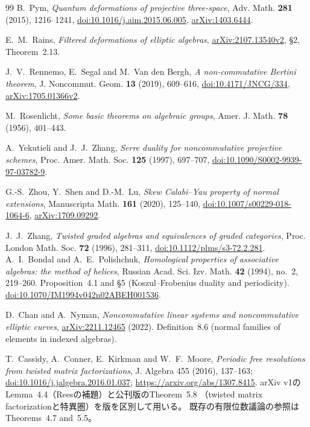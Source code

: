 \documentclass[11pt,a4paper]{ltjsarticle}
\numberwithin{equation}{section}
\begin{document}
\begin{thebibliography}{99}
B.~Pym,
\textit{Quantum deformations of projective three-space},
Adv. Math. \textbf{281} (2015), 1216--1241,
\href{https://doi.org/10.1016/j.aim.2015.06.005}{doi:10.1016/j.aim.2015.06.005},
\href{https://arxiv.org/abs/1403.6444}{arXiv:1403.6444}.

E.~M.~Rains,
\textit{Filtered deformations of elliptic algebras},
\href{https://arxiv.org/abs/2107.13540}{arXiv:2107.13540v2},
\S2, Theorem~2.13.

J.~V.~Rennemo, E.~Segal and M.~Van den Bergh,
\textit{A non-commutative Bertini theorem},
J. Noncommut. Geom. \textbf{13} (2019), 609--616,
\href{https://doi.org/10.4171/JNCG/334}{doi:10.4171/JNCG/334},
\href{https://arxiv.org/abs/1705.01366}{arXiv:1705.01366v2}.

M.~Rosenlicht,
\textit{Some basic theorems on algebraic groups},
Amer. J. Math. \textbf{78} (1956), 401--443.

A.~Yekutieli and J.~J.~Zhang,
\textit{Serre duality for noncommutative projective schemes},
Proc. Amer. Math. Soc. \textbf{125} (1997), 697--707,
\href{https://doi.org/10.1090/S0002-9939-97-03782-9}{doi:10.1090/S0002-9939-97-03782-9}.

G.-S.~Zhou, Y.~Shen and D.-M.~Lu,
\textit{Skew Calabi--Yau property of normal extensions},
Manuscripta Math. \textbf{161} (2020), 125--140,
\href{https://doi.org/10.1007/s00229-018-1064-6}{doi:10.1007/s00229-018-1064-6},
\href{https://arxiv.org/abs/1709.09292}{arXiv:1709.09292}.

J.~J.~Zhang,
\textit{Twisted graded algebras and equivalences of graded categories},
Proc. London Math. Soc. \textbf{72} (1996), 281--311,
\href{https://doi.org/10.1112/plms/s3-72.2.281}{doi:10.1112/plms/s3-72.2.281}.
A.~I.~Bondal and A.~E.~Polishchuk,
\emph{Homological properties of associative algebras: the method of helices},
Russian Acad. Sci. Izv. Math. \textbf{42} (1994), no.~2, 219--260.
Proposition~4.1 and \S5 (Koszul--Frobenius duality and periodicity).
\href{https://doi.org/10.1070/IM1994v042n02ABEH001536}
{doi:10.1070/IM1994v042n02ABEH001536}.

D.~Chan and A.~Nyman,
\emph{Noncommutative linear systems and noncommutative elliptic curves},
\href{https://arxiv.org/abs/2211.12465}{arXiv:2211.12465} (2022).
Definition~8.6 (normal families of elements in indexed algebras).

T.~Cassidy, A.~Conner, E.~Kirkman and W.~F.~Moore,
\emph{Periodic free resolutions from twisted matrix factorizations},
J. Algebra 455 (2016), 137--163;
\href{https://doi.org/10.1016/j.jalgebra.2016.01.037}{doi:10.1016/j.jalgebra.2016.01.037};
\url{https://arxiv.org/abs/1307.8415}.
arXiv v1のLemma~4.4（Reesの補題）と公刊版のTheorem~5.8
（twisted matrix factorizationと特異圏）を版を区別して用いる。
既存の有限位数議論の参照はTheorems~4.7 and~5.5。


\end{thebibliography}
\end{document}
